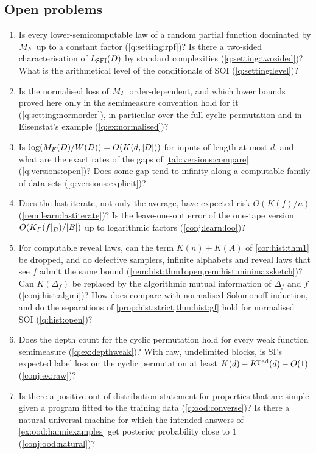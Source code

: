 \subsection{Open problems}\label{sec:discussion:open}

\begin{enumerate}[leftmargin=*,label=(\arabic*)]
\item Is every lower-semicomputable law of a random partial function dominated by $M_{F}$ up to a constant factor (\cref{q:setting:rpf})? Is there a two-sided characterisation of $L_{\mathrm{SFI}}(D)$ by standard complexities (\cref{q:setting:twosided})? What is the arithmetical level of the conditionals of SOI (\cref{q:setting:level})?
\item Is the normalised loss of $M_{F}$ order-dependent, and which lower bounds proved here only in the semimeasure convention hold for it (\cref{q:setting:normorder}), in particular over the full cyclic permutation and in Eisenstat's example (\cref{q:ex:normalised})?
\item Is $\log(M_{F}(D)/W(D))=O(K(d,|D|))$ for inputs of length at most $d$, and what are the exact rates of the gaps of \cref{tab:versions:compare} (\cref{q:versions:open})? Does some gap tend to infinity along a computable family of data sets (\cref{q:versions:explicit})?
\item Does the last iterate, not only the average, have expected risk $O(K(f)/n)$ (\cref{rem:learn:lastiterate})? Is the leave-one-out error of the one-tape version $O(K_{F}(f|_B)/|B|)$ up to logarithmic factors (\cref{conj:learn:loo})?
\item For computable reveal laws, can the term $K(n)+K(A)$ of \cref{cor:hist:thm1} be dropped, and do defective samplers, infinite alphabets and reveal laws that see $f$ admit the same bound (\cref{rem:hist:thm1open,rem:hist:minimaxsketch})? Can $K(\Delta_f)$ be replaced by the algorithmic mutual information of $\Delta_f$ and $f$ (\cref{conj:hist:algmi})? How does \SFIhist{} compare with normalised Solomonoff induction, and do the separations of \cref{prop:hist:strict,thm:hist:gf} hold for normalised SOI (\cref{q:hist:open})?
\item Does the depth count for the cyclic permutation hold for every weak function semimeasure (\cref{q:ex:depthweak})? With raw, undelimited blocks, is SI's expected label loss on the cyclic permutation at least $K(d)-K^{\mathrm{pad}}(d)-O(1)$ (\cref{conj:ex:raw})?
\item Is there a positive out-of-distribution statement for properties that are simple given a program fitted to the training data (\cref{q:ood:converse})? Is there a natural universal machine for which the intended answers of \cref{ex:ood:hanniexamples} get posterior probability close to $1$ (\cref{conj:ood:natural})?

\end{enumerate}

